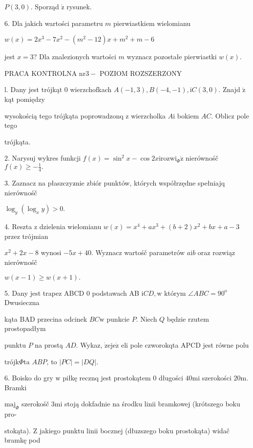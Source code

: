 \documentclass[a4paper,12pt]{article}
\begin{document}
$P(3,0).$ Sporząd $\acute{\mathrm{z}}$ rysunek.

6. Dla jakich wartości parametru $m$ pierwiastkiem wielomianu

$w(x)=2x^{3}-7x^{2}-(m^{2}-12)x+m^{2}+m-6$

jest $x=3$? Dla znalezionych wartości $m$ wyznacz pozostałe pierwiastki $w(x).$




PRACA KONTROLNA $\mathrm{n}\mathrm{r} 3-$ POZIOM ROZSZERZONY

l. Dany jest trójkąt $0$ wierzchofkach $A(-1,3), B(-4,-1), \mathrm{i}C(3,0).$ Znajd $\acute{\mathrm{z}}$ kąt pomiędzy

wysokością tego trójkąta poprowadzonq $\mathrm{z}$ wierzcholka $A\mathrm{i}$ bokiem $AC$. Oblicz pole tego

trójkąta.

2. Narysuj wykres funkcji $f(x)=\sin^{2}x-\cos 2x\mathrm{i}\mathrm{r}\mathrm{o}\mathrm{z}\mathrm{w}\mathrm{i}_{\Phi}\dot{\mathrm{z}}$ nierównośč $f(x)\displaystyle \geq-\frac{1}{4}.$

3. Zaznacz na płaszczyz$\acute{}$nie zbiór punktów, których współrzędne spełniajq nierównośč

$\log_{y}(\log_{x}y)>0.$

4. Reszta $\mathrm{z}$ dzielenia wielomianu $w(x)=x^{4}+ax^{3}+(b+2)x^{2}+bx+a-3$ przez trójmian

$x^{2}+2x-8$ wynosi $-5x+40$. Wyznacz wartośč parametrów $a\mathrm{i}b$ oraz rozwiąz nierównośč

$w(x-1)\geq w(x+1).$

5. Dany jest trapez ABCD $0$ podstawach AB $\mathrm{i}CD, \mathrm{w}$ którym $\angle ABC=90^{\mathrm{o}}$ Dwusieczna

kąta BAD przecina odcinek $BC\mathrm{w}$ punkcie $P$. Niech $Q$ będzie rzutem prostopadłym

punktu $P$ na prostą $AD$. Wykaz, $\dot{\mathrm{z}}\mathrm{e}\mathrm{j}\mathrm{e}\dot{\mathrm{z}}$ eli pole czworokqta APCD jest równe polu

trójk$\Phi$ta $ABP$, to $|PC|=|DQ|.$

6. Boisko do gry $\mathrm{w}$ piłkę recznq jest prostokątem $0$ długości $40\mathrm{m}\mathrm{i}$ szerokości $20\mathrm{m}$. Bramki

$\mathrm{m}\mathrm{a}\mathrm{j}_{\Phi}$ szerokośč $3\mathrm{m}\mathrm{i}$ stoją dokfadnie na środku linii bramkowej (krótszego boku pro-

stokąta). $\mathrm{Z}$ jakiego punktu linii bocznej (dłuzszego boku prostokąta) widač bramkę pod
\end{document}
